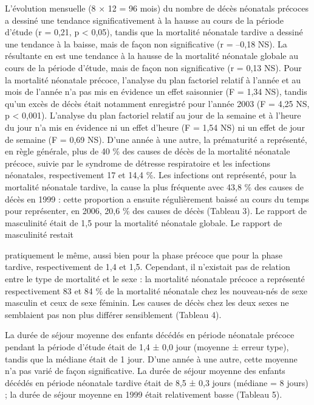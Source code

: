 \documentclass[
]{book}
\begin{document}
L'évolution mensuelle (8 × 12 = 96 mois) du nombre de
décès néonatals précoces a dessiné une tendance significativement
à la hausse au cours de la période d'étude (r = 0,21,
p \textless{} 0,05), tandis que la mortalité néonatale tardive a dessiné
une tendance à la baisse, mais de façon non significative
(r = --0,18 NS). La résultante en est une tendance à la hausse
de la mortalité néonatale globale au cours de la période
d'étude, mais de façon non significative (r = 0,13 NS).
Pour la mortalité néonatale précoce, l'analyse du plan
factoriel relatif à l'année et au mois de l'année n'a pas mis en
évidence un effet saisonnier (F = 1,34 NS), tandis qu'un
excès de décès était notamment enregistré pour l'année 2003
(F = 4,25 NS, p \textless{} 0,001). L'analyse du plan factoriel relatif
au jour de la semaine et à l'heure du jour n'a mis en évidence
ni un effet d'heure (F = 1,54 NS) ni un effet de jour de
semaine (F = 0,69 NS).
D'une année à une autre, la prématurité a représenté, en
règle générale, plus de 40 \% des causes de décès de la
mortalité néonatale précoce, suivie par le syndrome de
détresse respiratoire et les infections néonatales, respectivement
17 et 14,4 \%.
Les infections ont représenté, pour la mortalité néonatale
tardive, la cause la plus fréquente avec 43,8 \% des causes de
décès en 1999 : cette proportion a ensuite régulièrement
baissé au cours du temps pour représenter, en 2006,
20,6 \% des causes de décès (Tableau 3).
Le rapport de masculinité était de 1,5 pour la mortalité
néonatale globale. Le rapport de masculinité restait

pratiquement le même, aussi bien pour la phase précoce que
pour la phase tardive, respectivement de 1,4 et 1,5.
Cependant, il n'existait pas de relation entre le type
de mortalité et le sexe : la mortalité néonatale précoce
a représenté respectivement 83 et 84 \% de la mortalité
néonatale chez les nouveau-nés de sexe masculin et
ceux de sexe féminin. Les causes de décès chez les deux
sexes ne semblaient pas non plus différer sensiblement
(Tableau 4).

La durée de séjour moyenne des enfants décédés en
période néonatale précoce pendant la période d'étude était
de 1,4 ± 0,0 jour (moyenne ± erreur type), tandis que la
médiane était de 1 jour. D'une année à une autre, cette
moyenne n'a pas varié de façon significative. La durée de
séjour moyenne des enfants décédés en période néonatale
tardive était de 8,5 ± 0,3 jours (médiane = 8 jours) ; la
durée de séjour moyenne en 1999 était relativement basse
(Tableau 5).
\end{document}

